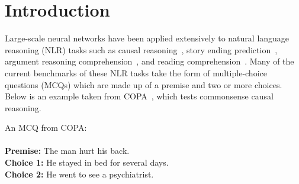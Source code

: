 \section{Introduction}
\label{sec:intro}


Large-scale neural networks have been applied extensively
to natural language reasoning (NLR) tasks such as
causal reasoning~\cite{copa2012}, 
story ending prediction~\cite{roc2017},
argument reasoning comprehension~\cite{arct2018}, and 
reading comprehension~\cite{yu2020reclor}.
Many of the current benchmarks of these NLR tasks take the 
form of multiple-choice questions (MCQs) which are made up 
of a premise and two or more choices. Below is an example taken 
from COPA~\cite{copa2012}, which tests commonsense causal 
reasoning.

\begin{example}\label{ex:copa}
An MCQ from COPA:\\ \\
\noindent
\textbf{Premise:} The man hurt his back.\\
\textbf{Choice 1:} He stayed in bed for several days.  \checksymbol \\
\textbf{Choice 2:} He went to see a psychiatrist. \crosssymbol 
\end{example}

